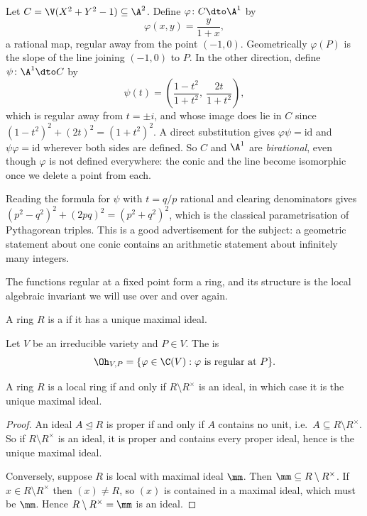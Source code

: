 \begin{example}\label{ex:circleparam}
	Let $C = \V(X^2+Y^2-1) \subseteq \A^2$. Define $\varphi \colon C \dto \A^1$ by
	$$\varphi(x,y) = \frac{y}{1+x},$$
	a rational map, regular away from the point $(-1,0)$. Geometrically $\varphi(P)$ is the slope of the line joining $(-1,0)$ to $P$. In the other direction, define $\psi \colon \A^1 \dto C$ by
	$$\psi(t) = \left(\frac{1-t^2}{1+t^2},\ \frac{2t}{1+t^2}\right),$$
	which is regular away from $t = \pm i$, and whose image does lie in $C$ since $(1-t^2)^2 + (2t)^2 = (1+t^2)^2$. A direct substitution gives $\varphi\psi = \mathrm{id}$ and $\psi\varphi = \mathrm{id}$ wherever both sides are defined. So $C$ and $\A^1$ are \emph{birational}, even though $\varphi$ is not defined everywhere: the conic and the line become isomorphic once we delete a point from each.

	Reading the formula for $\psi$ with $t = q/p$ rational and clearing denominators gives $(p^2-q^2)^2 + (2pq)^2 = (p^2+q^2)^2$, which is the classical parametrisation of Pythagorean triples. This is a good advertisement for the subject: a geometric statement about one conic contains an arithmetic statement about infinitely many integers.
\end{example}

The functions regular at a fixed point form a ring, and its structure is the local algebraic invariant we will use over and over again.

\begin{definition}
	A ring $R$ is a  if it has a unique maximal ideal.
\end{definition}

\begin{definition}
	Let $V$ be an irreducible variety and $P \in V$. The  is
	$$\Oh_{V,P} = \{\varphi \in \C(V) : \varphi \text{ is regular at } P\}.$$
\end{definition}

\begin{lemma}\label{lem:localcrit}
	A ring $R$ is a local ring if and only if $R \setminus R^\times$ is an ideal, in which case it is the unique maximal ideal.
\end{lemma}

\begin{proof}
	An ideal $A \trianglelefteq R$ is proper if and only if $A$ contains no unit, i.e.\ $A \subseteq R\setminus R^\times$. So if $R \setminus R^\times$ is an ideal, it is proper and contains every proper ideal, hence is the unique maximal ideal.

	Conversely, suppose $R$ is local with maximal ideal $\mm$. Then $\mm \subseteq R\setminus R^\times$. If $x \in R \setminus R^\times$ then $(x) \neq R$, so $(x)$ is contained in a maximal ideal, which must be $\mm$. Hence $R\setminus R^\times = \mm$ is an ideal.
\end{proof}

